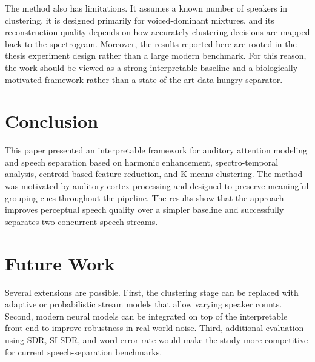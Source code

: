 \documentclass[conference]{IEEEtran}
\begin{document}
The method also has limitations. It assumes a known number of speakers in clustering, it is designed primarily for voiced-dominant mixtures, and its reconstruction quality depends on how accurately clustering decisions are mapped back to the spectrogram. Moreover, the results reported here are rooted in the thesis experiment design rather than a large modern benchmark. For this reason, the work should be viewed as a strong interpretable baseline and a biologically motivated framework rather than a state-of-the-art data-hungry separator.

\section{Conclusion}
This paper presented an interpretable framework for auditory attention modeling and speech separation based on harmonic enhancement, spectro-temporal analysis, centroid-based feature reduction, and K-means clustering. The method was motivated by auditory-cortex processing and designed to preserve meaningful grouping cues throughout the pipeline. The results show that the approach improves perceptual speech quality over a simpler baseline and successfully separates two concurrent speech streams.

\section{Future Work}
Several extensions are possible. First, the clustering stage can be replaced with adaptive or probabilistic stream models that allow varying speaker counts. Second, modern neural models can be integrated on top of the interpretable front-end to improve robustness in real-world noise. Third, additional evaluation using SDR, SI-SDR, and word error rate would make the study more competitive for current speech-separation benchmarks.
\end{document}
